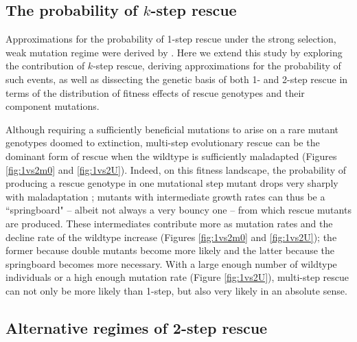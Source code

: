 \documentclass[9pt,twocolumn,twoside,lineno]{gsajnl}
\begin{document}
\subsection{The probability of $k$-step rescue}

Approximations for the probability of 1-step rescue under the strong selection, weak mutation regime were derived by \cite{Anciaux2018}.  
Here we extend this study by exploring the contribution of $k$-step rescue, deriving approximations for the probability of such events, as well as dissecting the genetic basis of both 1- and 2-step rescue in terms of the distribution of fitness effects of rescue genotypes and their component mutations.

Although requiring a sufficiently beneficial mutations to arise on a rare mutant genotypes doomed to extinction, multi-step evolutionary rescue can be the dominant form of rescue when the wildtype is sufficiently maladapted (Figures \ref{fig:1vs2m0} and \ref{fig:1vs2U}). 
Indeed, on this fitness landscape, the probability of producing a rescue genotype in one mutational step mutant drops very sharply with maladaptation \citep{Anciaux2018}; mutants with intermediate growth rates can thus be a ``springboard" -- albeit not always a very bouncy one -- from which rescue mutants are produced. 
These intermediates contribute more as mutation rates and the decline rate of the wildtype increase (Figures \ref{fig:1vs2m0} and \ref{fig:1vs2U}); the former because double mutants become more likely and the latter because the springboard becomes more necessary.
With a large enough number of wildtype individuals or a high enough mutation rate (Figure \ref{fig:1vs2U}), multi-step rescue can not only be more likely than 1-step, but also very likely in an absolute sense.

\subsection{Alternative regimes of 2-step rescue}
\end{document}
